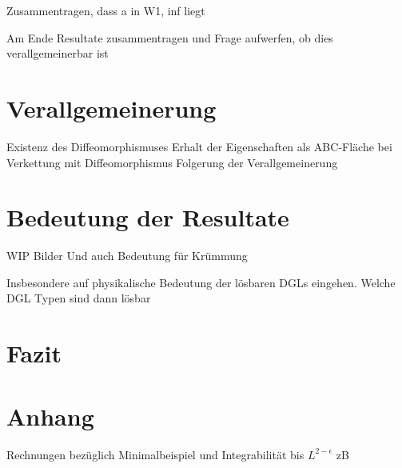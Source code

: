 \documentclass[10pt,a4paper,oneside]{report}
\begin{document}
Zusammentragen, dass
a in W1, inf liegt

Am Ende Resultate zusammentragen und Frage aufwerfen, ob dies verallgemeinerbar ist

\chapter{Verallgemeinerung}
Existenz des Diffeomorphismuses
Erhalt der Eigenschaften als ABC-Fläche bei Verkettung mit Diffeomorphismus
Folgerung der Verallgemeinerung

\chapter{Bedeutung der Resultate}
WIP
Bilder
Und auch Bedeutung für Krümmung

Insbesondere auf physikalische Bedeutung der lösbaren DGLs eingehen. Welche DGL Typen sind dann lösbar

\chapter{Fazit}

\chapter{Anhang}
Rechnungen bezüglich Minimalbeispiel und Integrabilität bis $L^{2-\epsilon}$ zB
\end{document}
